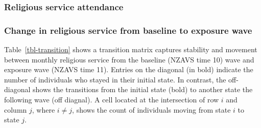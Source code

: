 \documentclass[
  singlecolumn]{article}
\begin{document}
\subsubsection{Religious service
attendance}\label{religious-service-attendance}

\subsubsection{Change in religious service from baseline to exposure
wave}\label{change-in-religious-service-from-baseline-to-exposure-wave}

Table~\ref{tbl-transition} shows a transition matrix captures stability
and movement between monthly religious service from the baseline (NZAVS
time 10) wave and exposure wave (NZAVS time 11). Entries on the diagonal
(in bold) indicate the number of individuals who stayed in their initial
state. In contrast, the off-diagonal shows the transitions from the
initial state (bold) to another state the following wave (off diagnal).
A cell located at the intersection of row \(i\) and column \(j\), where
\(i \neq j\), shows the count of individuals moving from state \(i\) to
state \(j\).
\end{document}
